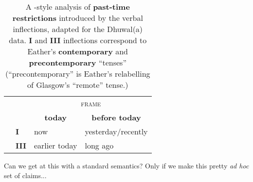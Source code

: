 \documentclass[11pt,dvipsnames]{article}
\begin{document}
\begin{itemize}
\begin{table}[H]
\begin{tabular}{@{}llll@{}}
			&                 & \multicolumn{2}{c}{\textsc{frame}}          \\ 
			&                 & \multicolumn{1}{c}{\textbf{today}}         & \multicolumn{1}{c}{\textbf{before today}}      \\\midrule
			\multirow{2}{*}{\textsc{\rotatebox[origin=c]{90}{infl}}} & \textbf{\phantom{I}I}    & now           & yesterday/recently \\
			& \textbf{III} & earlier today & long ago           \\ \bottomrule%
		\end{tabular}
		\caption{A \citet{Glasgow1964}-style analysis of \textbf{past-time restrictions} introduced by the verbal inflections, adapted for the Dhuwal(a) data. \textbf{I} and \textbf{III} inflections correspond to Eather's \textbf{contemporary} and \textbf{precontemporary} ``tenses'' (``precontemporary'' is Eather's \citeyearpar[166]{Eather2011} relabelling of Glasgow's ``remote'' tense.)}\label{GlaswegianTR}
	\end{table}
	




\end{itemize}
Can we get at this with a standard semantics? Only if we make this pretty \textit{ad hoc} set of claims...
\end{document}
